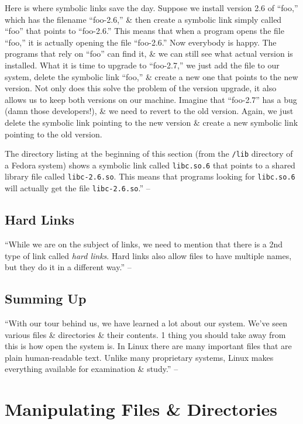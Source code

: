 \documentclass[oneside]{book}
\numberwithin{equation}{section}
\begin{document}
Here is where symbolic links save the day. Suppose we install version 2.6 of ``foo,'' which has the filename ``foo-2.6,'' \& then create a symbolic link simply called ``foo'' that points to ``foo-2.6.'' This means that when a program opens the file ``foo,'' it is actually opening the file ``foo-2.6.'' Now everybody is happy. The programs that rely on ``foo'' can find it, \& we can still see what actual version is installed. What it is time to upgrade to ``foo-2.7,'' we just add the file to our system, delete the symbolic link ``foo,'' \& create a new one that points to the new version. Not only does this solve the problem of the version upgrade, it also allows us to keep both versions on our machine. Imagine that ``foo-2.7'' has a bug (damn those developers!), \& we need to revert to the old version. Again, we just delete the symbolic link pointing to the new version \& create a new symbolic link pointing to the old version.

The directory listing at the beginning of this section (from the \texttt{/lib} directory of a Fedora system) shows a symbolic link called \texttt{libc.so.6} that points to a shared library file called \texttt{libc-2.6.so}. This means that programs looking for \texttt{libc.so.6} will actually get the file \texttt{libc-2.6.so}.'' -- \cite[pp. 61--63]{Shotts2019}

\subsection{Hard Links}
``While we are on the subject of links, we need to mention that there is a 2nd type of link called \textit{hard links}. Hard links also allow files to have multiple names, but they do it in a different way.'' -- \cite[p. 63]{Shotts2019}

\subsection{Summing Up}
``With our tour behind us, we have learned a lot about our system. We've seen various files \& directories \& their contents. 1 thing you should take away from this is how open the system is. In Linux there are many important files that are plain human-readable text. Unlike many proprietary systems, Linux makes everything available for examination \& study.'' -- \cite[p. 63]{Shotts2019}


\section{Manipulating Files \& Directories}
\end{document}
